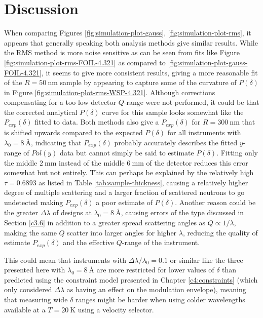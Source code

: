 \section{Discussion}
When comparing Figures \ref{fig:simulation-plot-gauss}, \ref{fig:simulation-plot-rms}, it appears that generally speaking both analysis methods give similar results. While the RMS method is more noise sensitive as can be seen from fits like Figure \ref{fig:simulation-plot-rms-FOIL-4.321} as compared to \ref{fig:simulation-plot-gauss-FOIL-4.321}, it seems to give more consistent results, giving a more reasonable fit of the $R=\SI{50}{\nano\meter}$ sample by appearing to capture some of the curvature of $P(\delta)$ in Figure \ref{fig:simulation-plot-rms-WSP-4.321}. Although corrections compensating for a too low detector $Q$-range \cite{kusmin2017} were not performed, it could be that the corrected analytical $P(\delta)$ curve for this sample looks somewhat like the $P_{exp}(\delta)$ fitted to data. Both methods also give a $P_{exp}(\delta)$ for $R = \SI{300}{\nano\meter}$ that is shifted upwards compared to the expected $P(\delta)$ for all instruments with $\lambda_0 = \SI{8}{\angstrom}$, indicating that $P_{exp}(\delta)$ probably accurately describes the fitted $y$-range of $Pol(y)$ data but cannot simply be said to estimate $P(\delta)$. Fitting only the middle $\SI{2}{\milli\meter}$ instead of the middle $\SI{6}{\milli\meter}$ of the detector reduces this error somewhat but not entirely. This can perhaps be explained by the relatively high $\tau = 0.6893$ as listed in Table \ref{tab:sample-thickness}, causing a relatively higher degree of multiple scattering and a larger fraction of scattered neutrons to go undetected making $P_{exp}(\delta)$ a poor estimate of $P(\delta)$. Another reason could be the greater $\Delta\lambda$ of designs at $\lambda_0 = \SI{8}{\angstrom}$, causing errors of the type discussed in Section \ref{c3.6} in addition to a greater spread scattering angles as $Q\propto 1/\lambda$, making the same $Q$ scatter into larger angles for higher $\lambda$, reducing the quality of estimate $P_{exp}(\delta)$ and the effective $Q$-range of the instrument.

This could mean that instruments with $\Delta\lambda/\lambda_0 = 0.1$ or similar like the three presented here with $\lambda_0 = \SI{8}{\angstrom}$ are more restricted for lower values of $\delta$ than predicted using the constraint model presented in Chapter \ref{c4:constraints} (which only considered $\Delta\lambda$ as having an effect on the modulation envelope), meaning that measuring wide $\delta$ ranges might be harder when using colder wavelengths available at a $T=\SI{20}{\kelvin}$ using a velocity selector. 

